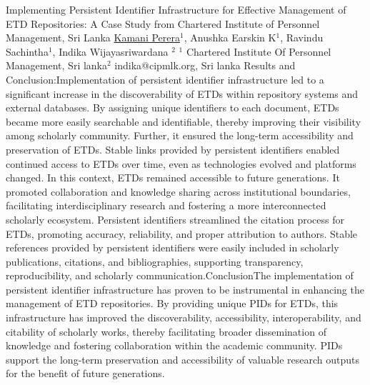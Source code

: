 \begin{abstract_online}{Implementing Persistent Identifier Infrastructure for Effective Management of ETD Repositories: A Case Study from Chartered Institute of Personnel Management, Sri Lanka}{%
        \underline{Kamani Perera}$^{1}$, Anushka Earskin K$^{1}$, Ravindu Sachintha$^{1}$, Indika Wijayasriwardana $^{2}$}{%
        }{%
        $^1$ Chartered Institute Of Personnel Management, Sri lanka\newline{}$^2$ indika@cipmlk.org, Sri lanka}
	Results and Conclusion:Implementation of persistent identifier infrastructure led to a significant increase in the discoverability of ETDs within repository systems and external databases. By assigning unique identifiers to each document, ETDs became more easily searchable and identifiable, thereby improving their visibility among scholarly community. Further, it ensured the long-term accessibility and preservation of ETDs. Stable links provided by persistent identifiers enabled continued access to ETDs over time, even as technologies evolved and platforms changed. In this context, ETDs remained accessible to future generations. It promoted collaboration and knowledge sharing across institutional boundaries, facilitating interdisciplinary research and fostering a more interconnected scholarly ecosystem. Persistent identifiers streamlined the citation process for ETDs, promoting accuracy, reliability, and proper attribution to authors. Stable references provided by persistent identifiers were easily included in scholarly publications, citations, and bibliographies, supporting transparency, reproducibility, and scholarly communication.ConclusionThe implementation of persistent identifier infrastructure has proven to be instrumental in enhancing the management of ETD repositories. By providing unique PIDs for ETDs, this infrastructure has improved the discoverability, accessibility, interoperability, and citability of scholarly works, thereby facilitating broader dissemination of knowledge and fostering collaboration within the academic community. PIDs support the long-term preservation and accessibility of valuable research outputs for the benefit of future generations.
    \end{abstract_online}
    
